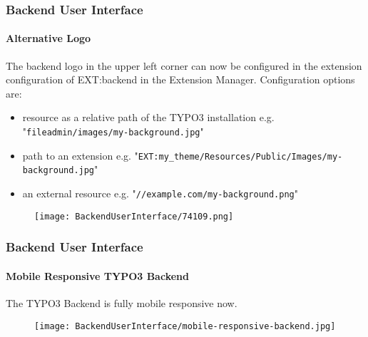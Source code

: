 \begin{frame}[fragile]
	\frametitle{Backend User Interface}
	\framesubtitle{Alternative Logo}

	The backend logo in the upper left corner can now be configured in the extension configuration
	of EXT:backend in the Extension Manager.\newline
	Configuration options are:

	\begin{itemize}
		\item resource as a relative path of the TYPO3 installation\newline
			\smaller
				e.g. "\texttt{fileadmin/images/my-background.jpg}"
			\normalsize

		\item path to an extension\newline
			\smaller
				e.g. "\texttt{EXT:my\_theme/Resources/Public/Images/my-background.jpg}"
			\normalsize

		\item an external resource\newline
			\smaller
				e.g. "\texttt{//example.com/my-background.png}"
			\normalsize

	\end{itemize}

	\begin{figure}
		\texttt{[image: BackendUserInterface/74109.png]}
	\end{figure}

\end{frame}


\begin{frame}[fragile]
	\frametitle{Backend User Interface}
	\framesubtitle{Mobile Responsive TYPO3 Backend}

	The TYPO3 Backend is fully mobile responsive now.

	\begin{figure}
		\texttt{[image: BackendUserInterface/mobile-responsive-backend.jpg]}
	\end{figure}

\end{frame}

